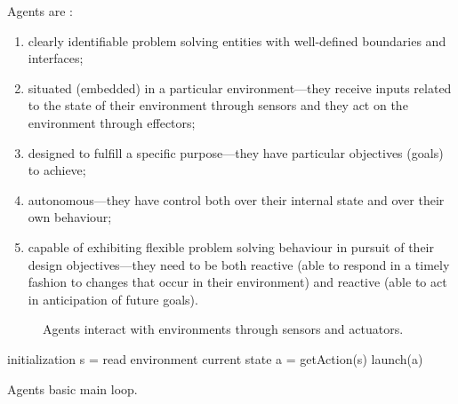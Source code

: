 \documentclass[11pt,oneside,a4paper,openright]{report}
\begin{document}
Agents are \cite{WooldridgeJennings1995}:
\begin{enumerate}[i-]
 \item clearly identifiable problem solving entities with well-defined boundaries and
interfaces;
\item situated (embedded) in a particular environment—they receive inputs related to the
state of their environment through sensors and they act on the environment through
effectors;
\item designed to fulfill a specific purpose—they have particular objectives (goals) to
achieve;
\item autonomous—they have control both over their internal state and over their own
behaviour;
\item capable of exhibiting flexible problem solving behaviour in pursuit of their design
objectives—they need to be both reactive (able to respond in a timely fashion to
changes that occur in their environment) and reactive (able to act in anticipation of
future goals).
\end{enumerate}


	\begin{figure}[h]
	\centering
	\setlength\fboxsep{0pt}
	\setlength\fboxrule{0.5pt}
	\caption{Agents interact with environments through sensors and actuators.}
	\label{fig:AgWool}
	\end{figure}


 	\begin{algorithm}[H]
	\SetAlgoSkip{} 
	\SetAlgoLined
	initialization\;
	{
		s = read environment current state\;
		a = getAction(s)\;
		launch(a)\;
	}
	\caption{Agents basic main loop.}
	\end{algorithm}
\end{document}
